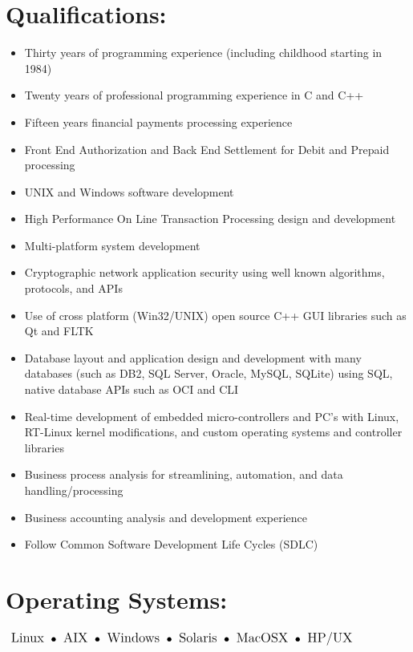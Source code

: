 \documentclass[10pt]{report}
\begin{document}

\vspace{-5em}

\section*{Qualifications:}

\begin{itemize}

\item Thirty years of programming experience (including childhood starting in 1984)
\item Twenty years of professional programming experience in C and C++
\item Fifteen years financial payments processing experience
\item Front End Authorization and Back End Settlement for Debit and Prepaid processing
\item UNIX and Windows software development
\item High Performance On Line Transaction Processing design and development
\item Multi-platform system development
\item Cryptographic network application security using well known algorithms, protocols, and APIs
\item Use of cross platform (Win32/UNIX) open source C++ GUI libraries such as Qt and FLTK
\item Database layout and application design and development with many databases (such as DB2, SQL Server, Oracle, MySQL, SQLite) using SQL, native database APIs such as OCI and CLI
\item Real-time development of embedded micro-controllers and PC’s with Linux, RT-Linux kernel modifications, and custom operating systems and controller libraries
\item Business process analysis for streamlining, automation, and data handling/processing
\item Business accounting analysis and development experience
\item Follow Common Software Development Life Cycles (SDLC)
\end{itemize}


\section*{Operating Systems:}

\begin{math}
\large
\textrm{ Linux }
\bullet \space \textrm{ AIX } \space
\bullet \space \textrm{ Windows } \space
\bullet \space \textrm{ Solaris } \space
\bullet \space \textrm{ MacOSX } \space
\bullet \space \textrm{ HP/UX }
\end{math}
\end{document}
